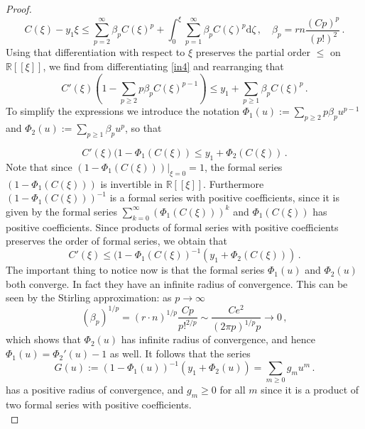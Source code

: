 \documentclass[10pt,a4paper]{amsart}
\begin{document}
\begin{proof}
\begin{equation}\label{in4}
    C(\xi)-y_1\xi \leq \sum_{p=2}^{\infty}\beta_pC(\xi)^p+\int_{0}^{\xi}\sum_{p=1}^{\infty}\beta_pC(\zeta)^p\mathrm{d}\zeta\,, \quad \beta_p=rn\frac{(Cp)^p}{(p!)^2}\,.
\end{equation}
Using that differentiation with respect to $\xi$ preserves the partial order $\leq$ on $\mathbb{R}[[\xi]]$, we find from differentiating \eqref{in4} and rearranging that 
\begin{equation*}
    C'(\xi)(1-\sum_{p\geq 2}p\beta_pC(\xi)^{p-1})\leq y_1+\sum_{p\geq 1}\beta_pC(\xi)^p\,.
\end{equation*}
To simplify the expressions we introduce the notation $\Phi_1(u):=\sum_{p\geq 2}p\beta_pu^{p-1}$ and $\Phi_2(u):=\sum_{p \geq 1}\beta_pu^p$, so that 

\begin{equation*}
    C'(\xi)(1-\Phi_1(C(\xi))\leq y_1+\Phi_2(C(\xi))\,.
\end{equation*}
Note that since $(1-\Phi_1(C(\xi)))|_{\xi=0}=1$, the  formal series $(1-\Phi_1(C(\xi)))$ is invertible in $\mathbb{R}[[\xi]].$ Furthermore $(1-\Phi_1(C(\xi)))^{-1}$ is a formal series with positive coefficients, since it is given by the formal series $\sum_{k=0}^{\infty}(\Phi_1(C(\xi)))^k$ and $\Phi_1(C(\xi))$ has positive coefficients. Since products of formal series with positive coefficients preserves the order of formal series, we obtain that 
\begin{equation}\label{in5}
    C'(\xi)\leq(1-\Phi_1(C(\xi))^{-1}(y_1+\Phi_2(C(\xi)))\,.
\end{equation}
The important thing to notice now is that the formal series $\Phi_1(u)$ and $\Phi_2(u)$ both converge. In fact they have an infinite radius of convergence. This can be seen by the Stirling approximation: as $p\to \infty$
\begin{equation}
(\beta_p)^{1/p}=(r\cdot n)^{1/p}\frac{Cp}{p!^{2/p}}\sim \frac{C e^2}{(2\pi p)^{1/p}p}\to 0\,,
\end{equation}
which shows that $\Phi_2(u)$ has infinite radius of convergence, and hence $\Phi_1(u)=\Phi_2'(u)-1$ as well. It follows that the series 
\begin{equation*}
    G(u):=(1-\Phi_1(u))^{-1}(y_1+\Phi_2(u))=\sum_{m\geq 0}g_mu^m\,.
\end{equation*}
has a positive radius of convergence, and $g_m \geq 0$ for all $m$ since it is a product of two formal series with positive coefficients.\\


\end{proof}
\end{document}
